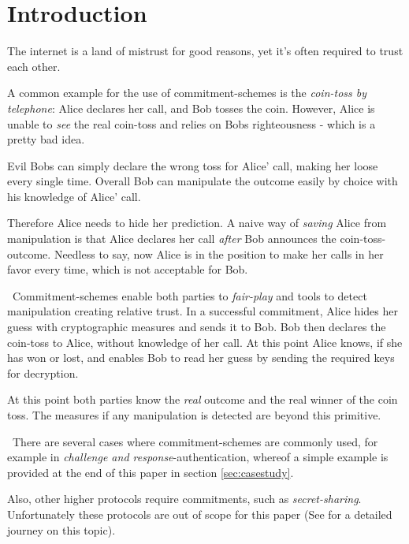 \section{Introduction}
The internet is a land of mistrust for good reasons, yet it's often required to trust each other. 

A common example for the use of commitment-schemes is the \textit{coin-toss by telephone}: Alice declares her call, and Bob tosses the coin. However, Alice is unable to \textit{see} the real coin-toss and relies on Bobs righteousness - which is a pretty bad idea. 

Evil Bobs can simply declare the wrong toss for Alice' call, making her loose every single time. Overall Bob can manipulate the outcome easily by choice with his knowledge of Alice' call. 

Therefore Alice needs to hide her prediction. A naive way of \textit{saving} Alice from manipulation is that Alice declares her call \textit{after} Bob announces the coin-toss-outcome. Needless to say, now Alice is in the position to make her calls in her favor every time, which is not acceptable for Bob. 

~\newline Commitment-schemes enable both parties to \textit{fair-play} and tools to detect manipulation creating relative trust. In a successful commitment, Alice hides her guess with cryptographic measures and sends it to Bob. Bob then declares the coin-toss to Alice, without knowledge of her call. At this point Alice knows, if she has won or lost, and enables Bob to read her guess by sending the required keys for decryption.

At this point both parties know the \textit{real} outcome and the real winner of the coin toss. The measures if any manipulation is detected are beyond this primitive.

~\newline There are several cases where commitment-schemes are commonly used, for example in \textit{challenge and response}-authentication, whereof a simple example is provided at the end of this paper in section \ref{sec:casestudy}.

Also, other higher protocols require commitments, such as \textit{secret-sharing}\cite{Shamir}. Unfortunately these protocols are out of scope for this paper (See \cite{Amos} for a detailed journey on this topic). 


